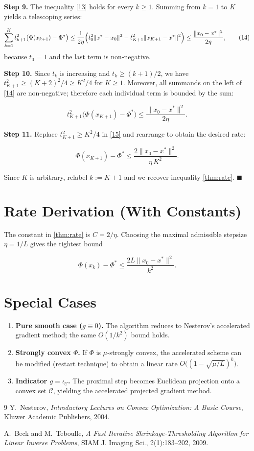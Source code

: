 \documentclass{article}
\begin{document}
\noindent\textbf{Step 9.} The inequality \eqref{13} holds for every $k\ge 1$.  Summing from $k=1$ to $K$ yields a telescoping series:

\[
\sum_{k=1}^{K} t_{k+1}^{2}\bigl(\Phi(x_{k+1})-\Phi^{*}\bigr)
\le \frac{1}{2\eta}\Bigl(t_{0}^{2}\|x^{*}-x_{0}\|^{2}
- t_{K+1}^{2}\|x_{K+1}-x^{*}\|^{2}\Bigr)
\le \frac{\|x_{0}-x^{*}\|^{2}}{2\eta}, \tag{14}
\]
because $t_{0}=1$ and the last term is non‑negative.

\noindent\textbf{Step 10.} Since $t_{k}$ is increasing and $t_{k}\ge (k+1)/2$, we have $t_{K+1}^{2}\ge (K+2)^{2}/4\ge K^{2}/4$ for $K\ge1$.  Moreover, all summands on the left of \eqref{14} are non‑negative; therefore each individual term is bounded by the sum:

\[
t_{K+1}^{2}\bigl(\Phi(x_{K+1})-\Phi^{*}\bigr)
\le \frac{\|x_{0}-x^{*}\|^{2}}{2\eta}. \tag{15}
\]

\noindent\textbf{Step 11.} Replace $t_{K+1}^{2}\ge K^{2}/4$ in \eqref{15} and rearrange to obtain the desired rate:

\[
\Phi(x_{K+1})-\Phi^{*}\le \frac{2\|x_{0}-x^{*}\|^{2}}{\eta\,K^{2}}.\tag{16}
\]

Since $K$ is arbitrary, relabel $k:=K+1$ and we recover inequality \eqref{thm:rate}. \hfill $\blacksquare$

\section*{Rate Derivation (With Constants)}
The constant in \eqref{thm:rate} is $C=2/\eta$.  Choosing the maximal admissible stepsize $\eta=1/L$ gives the tightest bound

\[
\Phi(x_{k})-\Phi^{*}\le \frac{2L\|x_{0}-x^{*}\|^{2}}{k^{2}}.
\]

\section*{Special Cases}
\begin{enumerate}[nosep]
\item \textbf{Pure smooth case ($g\equiv0$).} The algorithm reduces to Nesterov’s accelerated gradient method; the same $O(1/k^{2})$ bound holds.
\item \textbf{Strongly convex $\Phi$.} If $\Phi$ is $\mu$‑strongly convex, the accelerated scheme can be modified (restart technique) to obtain a linear rate $O\bigl((1-\sqrt{\mu/L})^{k}\bigr)$.
\item \textbf{Indicator $g=\iota_{\mathcal{C}}$.} The proximal step becomes Euclidean projection onto a convex set $\mathcal{C}$, yielding the accelerated projected gradient method.
\end{enumerate}

\begin{thebibliography}{9}
Y.~Nesterov, \emph{Introductory Lectures on Convex Optimization: A Basic Course}, Kluwer Academic Publishers, 2004.

A.~Beck and M.~Teboulle, \emph{A Fast Iterative Shrinkage‑Thresholding Algorithm for Linear Inverse Problems}, SIAM J. Imaging Sci., 2(1):183–202, 2009.
\end{thebibliography}
\end{document}
